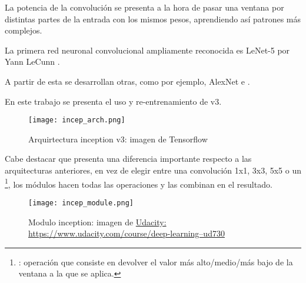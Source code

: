 La potencia de la convolución se presenta a la hora de pasar una ventana por distintas partes de la entrada con los mismos pesos, aprendiendo así patrones más complejos.

La primera red neuronal convolucional ampliamente reconocida es LeNet-5 por Yann LeCunn \cite{lecun98}. 

A partir de esta se desarrollan otras, como por ejemplo, AlexNet\cite{alexnet} e \cite{incep}.

En este trabajo se presenta el uso y re-entrenamiento de  v3.

\begin{figure}
	\centering
	\texttt{[image: incep\_arch.png]}
	\caption[Arquirtectura inception v3]{Arquirtectura inception v3: imagen de Tensorflow}\label{fig:incep_arch.png}
\end{figure}

Cabe destacar que  presenta una diferencia importante respecto a las arquitecturas anteriores, en vez de elegir entre una convolución 1x1, 3x3, 5x5 o un \footnote{: operación que consiste en devolver el valor más alto/medio/más bajo de la ventana a la que se aplica.}, los módulos  hacen todas las operaciones y las combinan en el resultado.

\begin{figure}
	\centering
	\texttt{[image: incep\_module.png]}
	\caption[Modulo inception]{Modulo inception: imagen de \href{https://www.udacity.com/course/deep-learning--ud730}{Udacity: https://www.udacity.com/course/deep-learning--ud730}}\label{fig:incep_module.png}
\end{figure}









